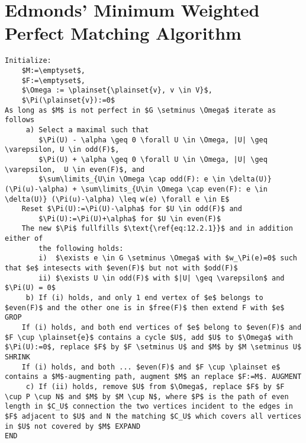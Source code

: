 \section*{Edmonds' Minimum Weighted Perfect Matching Algorithm}
\begin{lstlisting}
Initialize:
	$M:=\emptyset$, 
	$F:=\emptyset$,
	$\Omega := \plainset{\plainset{v}, v \in V}$,
	$\Pi(\plainset{v}):=0$
As long as $M$ is not perfect in $G \setminus \Omega$ iterate as follows
     a) Select a maximal such that 
		$\Pi(U) - \alpha \geq 0 \forall U \in \Omega, |U| \geq \varepsilon, U \in odd(F)$,
		$\Pi(U) + \alpha \geq 0 \forall U \in \Omega, |U| \geq \varepsilon,  U \in even(F)$, and
		$\sum\limits_{U\in \Omega \cap odd(F): e \in \delta(U)} (\Pi(u)-\alpha) + \sum\limits_{U\in \Omega \cap even(F): e \in \delta(U)} (\Pi(u)-\alpha) \leq w(e) \forall e \in E$
	Reset $\Pi(U):=\Pi(U)-\alpha$ for $U \in odd(F)$ and 
		$\Pi(U):=\Pi(U)+\alpha$ for $U \in even(F)$
	The new $\Pi$ fullfills $\text{\ref{eq:12.2.1}}$ and in addition either of
		the following holds:
		i)  $\exists e \in G \setminus \Omega$ with $w_\Pi(e)=0$ such that $e$ intesects with $even(F)$ but not with $odd(F)$
		ii) $\exists U \in odd(F)$ with $|U| \geq \varepsilon$ and $\Pi(U) = 0$
     b) If (i) holds, and only 1 end vertex of $e$ belongs to $even(F)$ and the other one is in $free(F)$ then extend F with $e$ GROP
	If (i) holds, and both end vertices of $e$ belong to $even(F)$ and $F \cup \plainset{e}$ contains a cycle $U$, add $U$ to $\Omega$ with $\Pi(U):=0$, replace $F$ by $F \setminus U$ and $M$ by $M \setminus U$ SHRINK
	If (i) holds, and both ... $even(F)$ and $F \cup \plainset e$ contains a $M$-augmenting path, augment $M$ an replace $F:=M$. AUGMENT
     c) If (ii) holds, remove $U$ from $\Omega$, replace $F$ by $F \cup P \cup N$ and $M$ by $M \cup N$, where $P$ is the path of even length in $C_U$ connection the two vertices incident to the edges in $F$ adjacent to $U$ and N the matching $C_U$ which covers all vertices in $U$ not covered by $M$ EXPAND
END
\end{lstlisting}
